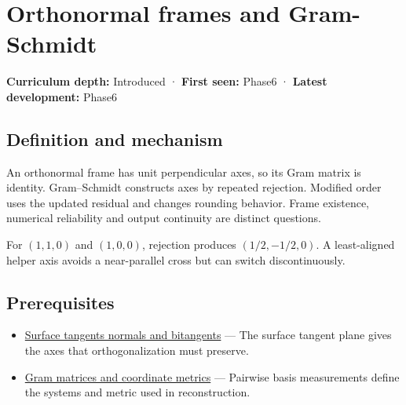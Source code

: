 \hypertarget{appendix-c39f1ed34271}{}\label{referencestart:appendix-c39f1ed34271}
\section{Orthonormal frames and Gram-Schmidt}\label{appendix-c39f1ed34271-orthonormal-frames-and-gram-schmidt}

\hypertarget{appendix-c39f1ed34271-orthonormal-frames-and-gram-schmidt}{}

\textbf{Curriculum depth:} Introduced · \textbf{First seen:} Phase6 · \textbf{Latest development:} Phase6

\begin{allmightroledefinition}

\subsection{Definition and mechanism}\label{appendix-c39f1ed34271-definition-and-mechanism}

\hypertarget{appendix-c39f1ed34271-definition-and-mechanism}{}

An orthonormal frame has unit perpendicular axes, so its Gram matrix is identity. Gram--Schmidt constructs axes by repeated rejection. Modified order uses the updated residual and changes rounding behavior. Frame existence, numerical reliability and output continuity are distinct questions.

\end{allmightroledefinition}

For \((1,1,0)\) and \((1,0,0)\), rejection produces \((1/2,-1/2,0)\). A least-aligned helper axis avoids a near-parallel cross but can switch discontinuously.

\subsection{Prerequisites}\label{appendix-c39f1ed34271-prerequisites}

\hypertarget{appendix-c39f1ed34271-prerequisites}{}

\begin{itemize}
\tightlist
\item
  \hyperref[appendix-e31893dec985]{Surface tangents normals and bitangents} --- The surface tangent plane gives the axes that orthogonalization must preserve.
\item
  \hyperref[appendix-3b863809f82a]{Gram matrices and coordinate metrics} --- Pairwise basis measurements define the systems and metric used in reconstruction.
\end{itemize}

